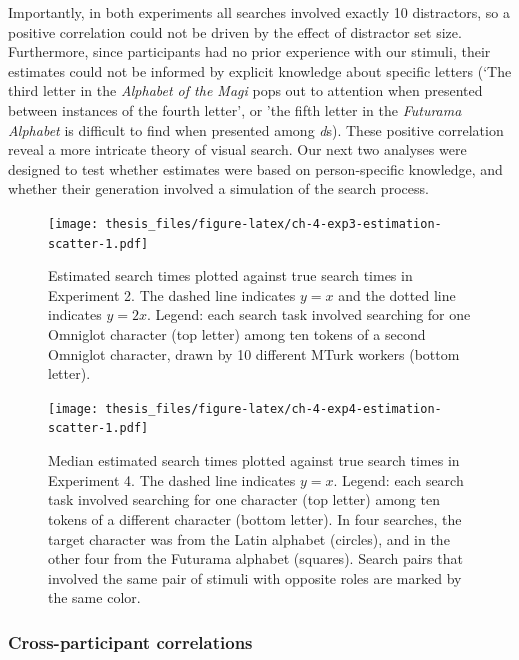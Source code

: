 \documentclass[12pt,twoside]{reedthesis}
\begin{document}
Importantly, in both experiments all searches involved exactly 10 distractors, so a positive correlation could not be driven by the effect of distractor set size. Furthermore, since participants had no prior experience with our stimuli, their estimates could not be informed by explicit knowledge about specific letters (`The third letter in the \emph{Alphabet of the Magi} pops out to attention when presented between instances of the fourth letter', or 'the fifth letter in the \emph{Futurama Alphabet} is difficult to find when presented among \emph{d}s). These positive correlation reveal a more intricate theory of visual search. Our next two analyses were designed to test whether estimates were based on person-specific knowledge, and whether their generation involved a simulation of the search process.
\begin{figure}
\centering
\texttt{[image: thesis\_files/figure-latex/ch-4-exp3-estimation-scatter-1.pdf]}
\caption{\label{fig:ch-4-exp3-estimation-scatter}Estimated search times plotted against true search times in Experiment 2. The dashed line indicates \(y=x\) and the dotted line indicates \(y=2x\). Legend: each search task involved searching for one Omniglot character (top letter) among ten tokens of a second Omniglot character, drawn by 10 different MTurk workers (bottom letter).}
\end{figure}
\begin{figure}
\centering
\texttt{[image: thesis\_files/figure-latex/ch-4-exp4-estimation-scatter-1.pdf]}
\caption{\label{fig:ch-4-exp4-estimation-scatter}Median estimated search times plotted against true search times in Experiment 4. The dashed line indicates \(y=x\). Legend: each search task involved searching for one character (top letter) among ten tokens of a different character (bottom letter). In four searches, the target character was from the Latin alphabet (circles), and in the other four from the Futurama alphabet (squares). Search pairs that involved the same pair of stimuli with opposite roles are marked by the same color.}
\end{figure}
\hypertarget{selfself}{%
\subsubsection*{Cross-participant correlations}\label{selfself}}
\end{document}
